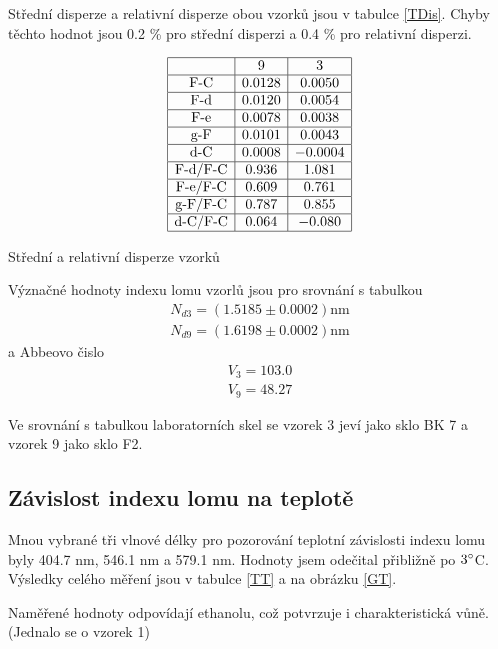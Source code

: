 \documentclass[a4paper,12pt]{article}
\begin{document}
Střední disperze a relativní disperze obou vzorků jsou v tabulce \ref{TDis}. Chyby těchto hodnot jsou 0.2 \% pro střední disperzi a 0.4 \% pro relativní disperzi.

\begin{table}
$$
\begin{array}{|c|c|c|}
\hline
&   9&  3 \\ \hline
\mbox{F-C}& 0.0128& 0.0050 \\ \hline
\mbox{F-d}& 0.0120& 0.0054 \\ \hline
\mbox{F-e}& 0.0078& 0.0038 \\ \hline
\mbox{g-F}& 0.0101& 0.0043 \\ \hline
\mbox{d-C}& 0.0008& -0.0004 \\ \hline
\mbox{F-d/F-C}& 0.936&  1.081 \\ \hline
\mbox{F-e/F-C}& 0.609&  0.761 \\ \hline
\mbox{g-F/F-C}& 0.787&  0.855 \\ \hline
\mbox{d-C/F-C}& 0.064&  -0.080 \\ \hline
\end{array}
$$
\caption{Střední a relativní disperze vzorků}
\label{TDis}
\end{table}





Význačné hodnoty indexu lomu vzorlů jsou pro srovnání s tabulkou
\begin{eqnarray}
N_{d3}=(1.5185 \pm 0.0002)\mbox{nm} \\
N_{d9}=(1.6198 \pm 0.0002)\mbox{nm}
\end{eqnarray}
a Abbeovo čislo
\begin{eqnarray}
V_3=103.0 \\
V_9=48.27
\end{eqnarray}

Ve srovnání s tabulkou laboratorních skel se vzorek 3 jeví jako sklo BK 7 a vzorek 9 jako sklo F2.



\subsection{Závislost indexu lomu na teplotě}
Mnou vybrané tři vlnové délky pro pozorování teplotní závislosti indexu lomu byly 404.7 nm, 546.1 nm a 579.1 nm. Hodnoty jsem odečital přibližně po $3^{\circ}$C. 
Výsledky celého měření jsou v tabulce \ref{TT} a na obrázku \ref{GT}.

Naměřené hodnoty odpovídají ethanolu, což potvrzuje i charakteristická vůně. (Jednalo se o vzorek 1)
\end{document}
